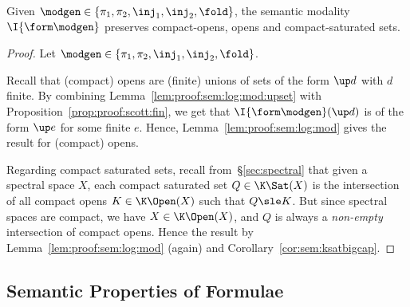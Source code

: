 \begin{lemma}
\label{lem:proof:sem:log:mod:mod}
Given $\modgen \in \{\pi_1, \pi_2, \inj_1, \inj_2, \fold\}$,
the semantic modality $\I{\form\modgen}$
preserves compact-opens, opens and compact-saturated sets.
\end{lemma}

\begin{proof}
Let $\modgen \in \{\pi_1, \pi_2, \inj_1, \inj_2, \fold\}$.

Recall that (compact) opens are (finite) unions of sets of the form
$\up d$ with $d$ finite.
By combining Lemma~\ref{lem:proof:sem:log:mod:upset} with
Proposition~\ref{prop:proof:scott:fin},
we get that $\I{\form\modgen}(\up d)$ is of the form $\up e$
for some finite $e$.
Hence, Lemma~\ref{lem:proof:sem:log:mod} gives the result for (compact) opens.

Regarding compact saturated sets, recall from~\S\ref{sec:spectral}
that given a spectral space $X$,
each compact saturated set $Q \in \K\Sat(X)$
is the intersection of all compact opens $K \in \K\Open(X)$
such that $Q \sle K$.
But since spectral spaces are compact, we have $X \in \K\Open(X)$,
and $Q$ is always a \emph{non-empty} intersection of compact opens.
Hence the result by Lemma~\ref{lem:proof:sem:log:mod} (again)
and Corollary~\ref{cor:sem:ksatbigcap}.
\end{proof}


\subsection{Semantic Properties of Formulae}
\label{sec:proof:sem:log:form}

